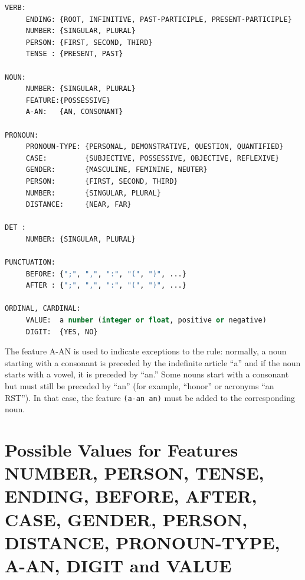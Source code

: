 \documentclass[10pt,a4paper]{report}
\begin{document}
   
         
         
       
        
       
  
           
           
           
           
          
\begin{lstlisting}[language=Lisp]
VERB: 
     ENDING: {ROOT, INFINITIVE, PAST-PARTICIPLE, PRESENT-PARTICIPLE}
     NUMBER: {SINGULAR, PLURAL}
     PERSON: {FIRST, SECOND, THIRD}
     TENSE : {PRESENT, PAST}

NOUN: 
     NUMBER: {SINGULAR, PLURAL}
     FEATURE:{POSSESSIVE}
     A-AN:   {AN, CONSONANT}

PRONOUN: 
     PRONOUN-TYPE: {PERSONAL, DEMONSTRATIVE, QUESTION, QUANTIFIED}
     CASE:         {SUBJECTIVE, POSSESSIVE, OBJECTIVE, REFLEXIVE}
     GENDER:       {MASCULINE, FEMININE, NEUTER}
     PERSON:       {FIRST, SECOND, THIRD}
     NUMBER:       {SINGULAR, PLURAL}
     DISTANCE:     {NEAR, FAR}

DET : 
     NUMBER: {SINGULAR, PLURAL}

PUNCTUATION:
     BEFORE: {";", ",", ":", "(", ")", ...}
     AFTER : {";", ",", ":", "(", ")", ...}

ORDINAL, CARDINAL:
     VALUE:  a number (integer or float, positive or negative)
     DIGIT:  {YES, NO}
\end{lstlisting}
  

The feature A-AN is used to indicate exceptions to the rule: normally, a
noun starting with a consonant is preceded by the indefinite article ``a''
and if the noun starts with a vowel, it is preceded by ``an.''  Some nouns
start with a consonant but must still be preceded by ``an'' (for example,
``honor'' or acronyms ``an RST'').  In that case, the feature {\tt (a-an an)}
must be added to the corresponding noun.


\section{Possible Values for Features NUMBER, PERSON, TENSE, ENDING,
BEFORE, AFTER, CASE, GENDER, PERSON, DISTANCE, PRONOUN-TYPE, A-AN, DIGIT
and VALUE}
\end{document}
